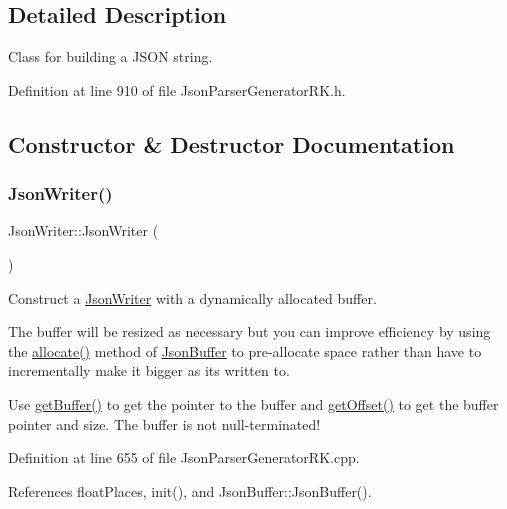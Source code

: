 \subsection{Detailed Description}
Class for building a J\+S\+ON string. 

Definition at line 910 of file Json\+Parser\+Generator\+R\+K.\+h.



\subsection{Constructor \& Destructor Documentation}
\mbox{\label{class_json_writer_ac236bb60b9ae908fd178baff276df0c8}} 
\subsubsection{\texorpdfstring{Json\+Writer()}{JsonWriter()}\hspace{0.1cm}{\footnotesize\ttfamily [1/2]}}
{\footnotesize\ttfamily Json\+Writer\+::\+Json\+Writer (\begin{DoxyParamCaption}{ }\end{DoxyParamCaption})}



Construct a \hyperlink{class_json_writer}{Json\+Writer} with a dynamically allocated buffer. 

The buffer will be resized as necessary but you can improve efficiency by using the \hyperlink{class_json_buffer_a1eb9d0cae3ef9a9ac56b8580bc70fe2e}{allocate()} method of \hyperlink{class_json_buffer}{Json\+Buffer} to pre-\/allocate space rather than have to incrementally make it bigger as it\textquotesingle{}s written to.

Use \hyperlink{class_json_buffer_af8ca5014e0275487273f94c6b9223acf}{get\+Buffer()} to get the pointer to the buffer and \hyperlink{class_json_buffer_adedc049fc02ef5bad2b3f8e7a1ba17b6}{get\+Offset()} to get the buffer pointer and size. The buffer is not null-\/terminated! 

Definition at line 655 of file Json\+Parser\+Generator\+R\+K.\+cpp.



References float\+Places, init(), and Json\+Buffer\+::\+Json\+Buffer().

\mbox{\label{class_json_writer_ac6555dd3dfadc937848046a58bd5f974}} 
